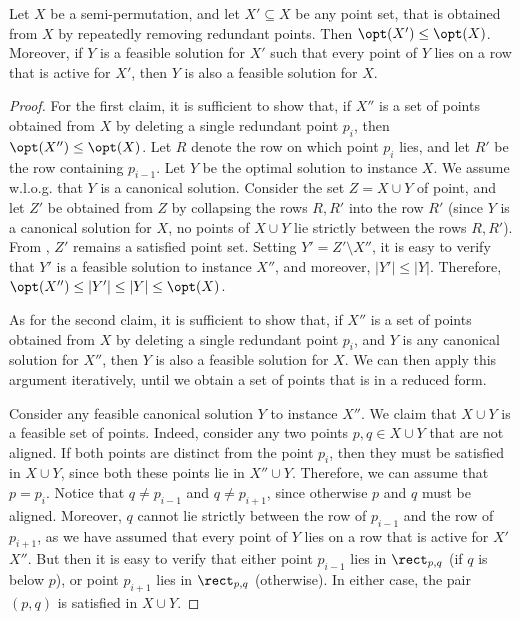 \documentclass{toc}
\begin{document}
\begin{lemma}\label{lem: reduced point set} 
	Let $X$ be a semi-permutation, and let $X' \subseteq X$ be any point set, that is obtained from $X$ by repeatedly removing redundant points.  Then $\opt(X')\leq \opt(X)$. Moreover, if $Y$ is a feasible solution for $X'$ such that every point of $Y$ lies on a row that is active for $X'$, then $Y$ is also a feasible solution for $X$.
\end{lemma}
\begin{proof}
For the first claim, it is sufficient to show that, if $X''$ is a set of points obtained from $X$ by deleting a single redundant point $p_i$, then $\opt(X'')\leq \opt(X)$. Let $R$ denote the row on which point $p_i$ lies, and let $R'$ be the row containing $p_{i-1}$. Let $Y$ be the optimal solution to instance $X$. We assume w.l.o.g. that $Y$ is a canonical solution. Consider the set $Z=X\cup Y$ of point, and let $Z'$ be obtained from $Z$ by collapsing the rows $R,R'$ into the row $R'$ (since $Y$ is a canonical solution for $X$, no points of $X\cup Y$ lie strictly between the rows $R,R'$). From , $Z'$ remains a satisfied point set. Setting $Y'=Z'\setminus X''$, it is easy to verify that $Y'$ is a feasible solution to instance $X''$, and moreover, $|Y'|\leq |Y|$. Therefore, $\opt(X'')\leq |Y'|\leq |Y|\leq \opt(X)$.


As for the second claim, it is sufficient to show that, if $X''$ is a set of points obtained from $X$ by deleting a single redundant point $p_i$, and $Y$ is any canonical solution for $X''$, then $Y$ is also a feasible solution for $X$. We can then apply this argument iteratively, until we obtain a set of points that is in a reduced form.
	
	Consider any feasible canonical solution $Y$ to instance $X''$. We claim that $X \cup Y$ is a feasible set of points. Indeed,
	consider any two points $p,q \in X \cup Y$ that are not aligned. If both points are distinct from the point $p_i$, then they must be satisfied in $X\cup Y$, since both these points lie in $X''\cup Y$. Therefore, we can assume that $p=p_i$. Notice that $q \neq p_{i-1}$ and  $q \neq p_{i+1}$, since otherwise $p$ and $q$ must be aligned. Moreover, $q$ cannot lie strictly between the row of $p_{i-1}$ and the row of $p_{i+1}$, as we have assumed that every point of $Y$ lies on a row that is active for $X'$ $X''$. But then it is easy to verify that either point $p_{i-1}$ lies in $\rect_{p,q}$ (if $q$ is below $p$), or point $p_{i+1}$ lies in $\rect_{p,q}$ (otherwise). In either case, the pair $(p,q)$ is satisfied in $X\cup Y$.    
\end{proof}
\end{document}
